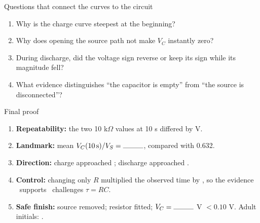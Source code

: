 \begin{teloscard}{Questions that connect the curves to the circuit}
\begin{enumerate}[itemsep=1.15em,topsep=.35em]
\item Why is the charge curve steepest at the beginning?
  \par{}
\item Why does opening the source path not make \(V_C\) instantly zero?
  \par{}
\item During discharge, did the voltage sign reverse or keep its sign while its
  magnitude fell? \writein{3cm}
\item What evidence distinguishes “the capacitor is empty” from “the source is
  disconnected”? \writein{5cm}
\end{enumerate}
\end{teloscard}

\begin{teloscard}{Final proof}
\begin{enumerate}[itemsep=.72em,topsep=.35em]
\item \textbf{Repeatability:} the two 10 k\(\Omega\) values at 10 s differed by
  \writein{1cm} V.
\item \textbf{Landmark:} mean \(V_C(10\,{\rm s})/V_S=\writein{1cm}\), compared
  with 0.632.
\item \textbf{Direction:} charge approached \writein{1cm}; discharge approached
  \writein{1cm}.
\item \textbf{Control:} changing only \(R\) multiplied the observed time by
  \writein{1cm}, so the evidence \tickbox\ supports \quad\tickbox\ challenges
  \(\tau=RC\).
\item \textbf{Safe finish:} source removed; resistor fitted;
  \(V_C=\writein{1cm}\) V \(<0.10\) V. Adult initials: \writein{1cm}.
\end{enumerate}
\end{teloscard}

\endgroup

